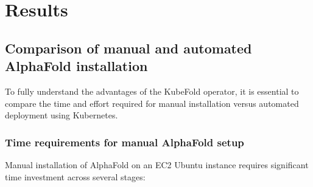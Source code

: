 \chapter{Results}
%
%


\section{Comparison of manual and automated AlphaFold installation}

To fully understand the advantages of the KubeFold operator, it is essential to compare the time and effort required for manual installation versus automated deployment using Kubernetes.

\subsection{Time requirements for manual AlphaFold setup}

Manual installation of AlphaFold on an EC2 Ubuntu instance requires significant time investment across several stages:

